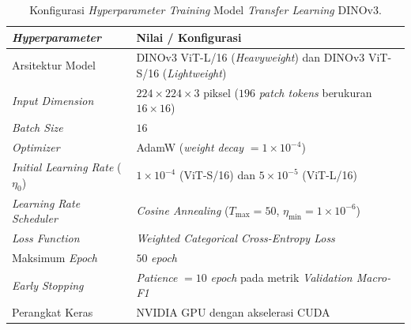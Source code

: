\begin{table}[!htbp]
    \centering
    \caption{Konfigurasi \textit{Hyperparameter Training} Model \textit{Transfer Learning} DINOv3.}
    \label{tab:hiperparameter_pelatihan}
    \small
    \renewcommand{\arraystretch}{1.25}
    \begin{tabularx}{\textwidth}{l >{\raggedright\arraybackslash}X}
        \toprule
        \textbf{\textit{Hyperparameter}}               & \textbf{Nilai / Konfigurasi}                                                             \\
        \midrule
        Arsitektur Model                               & DINOv3 ViT-L/16 (\textit{Heavyweight}) dan DINOv3 ViT-S/16 (\textit{Lightweight})        \\
        \textit{Input Dimension}                       & $224 \times 224 \times 3$ piksel ($196$ \textit{patch tokens} berukuran $16\times16$)     \\
        \textit{Batch Size}                            & $16$                                                                                     \\
        \textit{Optimizer}                             & AdamW (\textit{weight decay} $= 1\times 10^{-4}$)                                        \\
        \textit{Initial Learning Rate} ($\eta_0$)      & $1\times 10^{-4}$ (ViT-S/16) dan $5\times 10^{-5}$ (ViT-L/16)                            \\
        \textit{Learning Rate Scheduler}               & \textit{Cosine Annealing} ($T_{\text{max}} = 50$, $\eta_{\text{min}} = 1\times 10^{-6}$) \\
        \textit{Loss Function}                         & \textit{Weighted Categorical Cross-Entropy Loss}                                         \\
        Maksimum \textit{Epoch}                        & $50$ \textit{epoch}                                                                      \\
        \textit{Early Stopping}                        & \textit{Patience} $= 10$ \textit{epoch} pada metrik \textit{Validation Macro-F1}         \\
        Perangkat Keras                                & NVIDIA GPU dengan akselerasi CUDA                                                        \\
        \bottomrule
    \end{tabularx}
\end{table}

